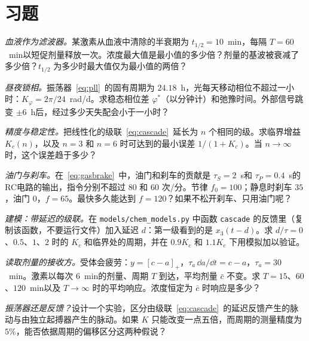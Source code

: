 \section{习题}

\begin{exercise}[\lvlA]
\label{ex:16:1}
\emph{血液作为滤波器。}某激素从血液中清除的半衰期为 $t_{1/2}=10$~min，每隔 $T=60$~min以短促剂量释放一次。浓度最大值是最小值的多少倍？剂量的基波被衰减了多少倍？$t_{1/2}$ 为多少时最大值仅为最小值的两倍？
\end{exercise}

\begin{exercise}[\lvlA]
\label{ex:16:2}
\emph{昼夜锁相。}振荡器~\eqref{eq:pll}~的固有周期为 $24.18$~h，光每天移动相位不超过一小时：$K_\varphi=2\pi/24$~rad/d。求稳态相位差 $\varphi^*$（以分钟计）和弛豫时间。外部信号跳变 $\pm6$~h后，经过多少天失配会小于一小时？
\end{exercise}

\begin{exercise}[\lvlB]
\label{ex:16:3}
\emph{精度与稳定性。}把线性化的级联~\eqref{eq:cascade}~延长为 $n$ 个相同的级。求临界增益 $K_c(n)$，以及 $n=3$ 和 $n=6$ 时可达到的最小误差 $1/(1+K_c)$。当 $n\to\infty$ 时，这个误差趋于多少？
\end{exercise}

\begin{exercise}[\lvlB]
\label{ex:16:4}
\emph{油门与刹车。}在~\eqref{eq:gasbrake}~中，油门和刹车的贡献是 $\tau_S=2$~s和 $\tau_P=0.4$~s的RC电路的输出，指令分别不超过 $80$ 和 $60$ 次/分。节律 $f_0=100$；静息时刹车 $35$，油门 $0$，$f=65$。最快多久能达到 $f=120$？如果不松开刹车、只用油门呢？
\end{exercise}

\begin{exercise}[\lvlB]
\label{ex:16:5}
\emph{建模：带延迟的级联。}在 \texttt{models/\allowbreak chem\_models.py} 中函数 \texttt{cascade} 的反馈里（复制该函数，不要运行文件）加入延迟 $d$：第一级看到的是 $x_3(t-d)$。求 $d/\tau=0$、$0.5$、$1$、$2$ 时的 $K_c$ 和临界处的周期，并在 $0.9K_c$ 和 $1.1K_c$ 下用模拟加以验证。
\end{exercise}

\begin{exercise}[\lvlB]
\label{ex:16:6}
\emph{读取剂量的接收方。}受体会疲劳：$y=[c-a]_+$，$\tau_a\,\dd a/\dd t=c-a$，$\tau_a=30$~min。激素以每次 $6$~min的剂量、周期 $T$ 到达，平均剂量 $\bar c$ 不变。求 $T=15$、$60$、$120$~min以及 $T\to\infty$ 时的平均响应。浓度恒定为 $\bar c$ 时响应是多少？
\end{exercise}

\begin{exercise}[\lvlC]
\label{ex:16:7}
\emph{振荡器还是反馈？}设计一个实验，区分由级联~\eqref{eq:cascade}~的延迟反馈产生的脉动与由独立起搏器产生的脉动。如果 $K$ 只能改变一点五倍，而周期的测量精度为 $5\%$，能否依据周期的偏移区分这两种假说？
\end{exercise}
